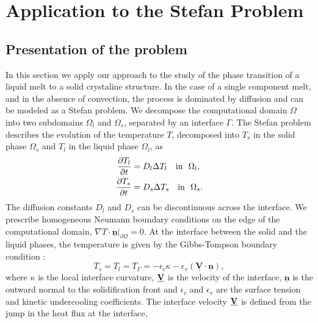 \section{Application to the Stefan Problem} \label{sec:application}

\subsection{Presentation of the problem}

In this section we apply our approach to the study of the phase transition of a liquid melt to a solid crystaline structure. In the case of a single component melt, and in the absence of convection, the process is dominated by diffusion and can be modeled as a Stefan problem. We decompose the computational domain $\Omega$ into   two subdomains $\Omega_l$ and $\Omega_s$, separated by an interface $\Gamma$. The Stefan problem describes the evolution of the temperature $T$, decomposed into $T_s$ in the solid phase $\Omega_s$ and $T_l$ in the liquid phase $\Omega_l$, as
\begin{align}
\frac{\partial T_l}{\partial t} & = D_l \Delta T_l \quad \mathrm{in} ~~ \Omega_l, \label{eq:stefan_heat_equation_l} \\
\frac{\partial T_s}{\partial t} & = D_s \Delta T_s \quad \mathrm{in} ~~ \Omega_s. \label{eq:stefan_heat_equation_s}
\end{align}
The diffusion constants $D_l$ and $D_s$ can be discontinuous across the interface. We prescribe homogeneous Neumann boundary conditions on the edge of the computational domain, $\nabla T \cdot \underline{\mathbf{n}}\vert_{\partial \Omega}=0$. At the interface between the solid and the liquid phases, the temperature is given by the Gibbs-Tompson boundary condition \cite{Alexiades;Solomon;Wilson:88:The-formation-of-a-s, Alexiades;Solomon:93:Mathematical-Modelin}:
\begin{equation} \label{eq:stefan_gibbs_tompson}
T_s = T_l = T_{\Gamma} = -\epsilon_c \kappa - \epsilon_v (\underline{\mathbf{V}} \cdot \underline{\mathbf{n}}),
\end{equation}
where $\kappa$ is the local interface curvature, $\underline{\mathbf{V}}$ is the velocity of the interface, $\underline{\mathbf{n}}$ is the outward normal to the solidification front and $\epsilon_c$ and $\epsilon_v$ are the surface tension and kinetic undercooling coefficients. The interface velocity $\underline{\mathbf{V}}$ is defined from the jump in the heat flux at the interface,
